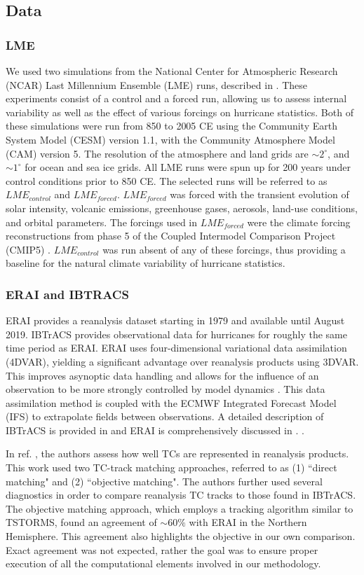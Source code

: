 \subsection{Data}
\subsubsection{LME}
We used two simulations from the National Center for Atmospheric Research (NCAR) Last Millennium Ensemble (LME) runs, described in \cite{gcm_lme}. These experiments consist of a control and a forced run, allowing us to assess internal variability as well as the effect of various forcings on hurricane statistics. Both of these simulations were run from 850 to 2005 CE using the Community Earth System Model (CESM) version 1.1, with the Community Atmosphere Model (CAM) version 5. The resolution of the atmosphere and land grids are ${\sim}2^\circ$, and ${\sim}1^\circ$ for ocean and sea ice grids. All LME runs were spun up for 200 years under control conditions prior to 850 CE. The selected runs will be referred to as $LME_{control}$ and $LME_{forced}$. $LME_{forced}$ was forced with the transient evolution of solar intensity, volcanic emissions, greenhouse gases, aerosols, land-use conditions, and orbital parameters. The forcings used in $LME_{forced}$ were the climate forcing reconstructions from phase 5 of the Coupled Intermodel Comparison Project (CMIP5) \cite{gmd-4-33-2011}. $LME_{control}$ was run absent of any of these forcings, thus providing a baseline for the natural climate variability of hurricane statistics. 

\subsubsection{ERAI and IBTRACS}
\label{erai}
ERAI provides a reanalysis dataset starting in 1979 and available until August 2019. IBTrACS provides observational data for hurricanes for roughly the same time period as ERAI. ERAI uses four-dimensional variational data assimilation (4DVAR), yielding a significant advantage over reanalysis products using 3DVAR. This improves asynoptic data handling and allows for the influence of an observation to be more strongly controlled by model dynamics \cite{tc_reanal:2}. This data assimilation method is coupled with the ECMWF Integrated Forecast Model (IFS) to extrapolate fields between observations. A detailed description of IBTrACS is provided in \cite{ibtracs} and ERAI is comprehensively discussed in \cite{erai_reanal}. . 
\par
In ref. \cite{tc_reanal:1}, the authors assess how well TCs are represented in reanalysis products. This work used two TC-track matching approaches, referred to as (1) ``direct matching" and (2) ``objective matching". The authors further used several diagnostics in order to compare reanalysis TC tracks to those found in IBTrACS. The objective matching approach, which employs a tracking algorithm similar to TSTORMS, found an agreement of ${\sim}60\%$ with ERAI in the Northern Hemisphere. This agreement also highlights the objective in our own comparison. Exact agreement was not expected, rather the goal was to ensure proper execution of all the computational elements involved in our methodology. 

